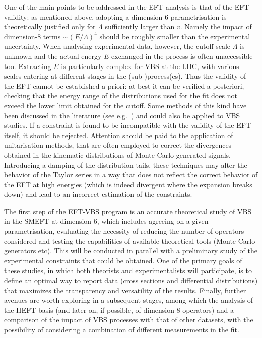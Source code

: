 One of the main points to be addressed in the EFT analysis is that of the EFT validity: as mentioned above, adopting a dimension-6 parametrisation is theoretically justified only for $\Lambda$ sufficiently larger than $v$. Namely the impact of dimension-8 terms $\sim (E/\Lambda)^4$ should be roughly smaller than the experimental uncertainty. When analysing experimental data, however, the cutoff scale $\Lambda$ is unknown and the actual energy $E$ exchanged in the process is often unaccessible too. Extracting $E$ is particularly complex for VBS at the LHC, with various scales entering at different stages in the (sub-)process(es).
Thus the validity of the EFT cannot be established a priori: at best it can be verified a posteriori, checking that the energy range of the distributions used for the fit does not exceed the lower limit obtained for the cutoff. Some methods of this kind have been discussed in the literature (see e.g.~\cite{Busoni:2013lha,Buchmueller:2013dya,Biekoetter:2014jwa,Englert:2014cva,Racco:2015dxa,Contino:2016jqw,Brivio:2017ije}) and could also be applied to VBS studies.
If a constraint is found to be incompatible with the validity of the EFT itself, it should be rejected.
Attention should be paid to the application of unitarisation methods, that are often employed to correct the divergences obtained in the kinematic distributions of Monte Carlo generated signals. Introducing a damping of the distribution tails, these techniques may alter the behavior of the Taylor series in a way that does not reflect the correct behavior of the EFT at high energies (which is indeed divergent where the expansion breaks down) and lead to an incorrect estimation of the constraints.

The first step of the EFT-VBS program is an accurate theoretical study of VBS in the SMEFT at dimension 6, which includes agreeing on a given parametrisation, evaluating the necessity of reducing the number of operators considered and testing the capabilities of available theoretical tools (Monte Carlo generators etc).
This will be conducted in parallel with a preliminary study of the experimental constraints that could be obtained. One of the primary goals of these studies, in which both theorists and experimentalists will participate, is to define an optimal way to report data (cross sections and differential distributions) that maximizes the transparency and versatility of the results.
Finally, further avenues are worth exploring in a subsequent stages, among which the analysis of the HEFT basis (and later on, if possible, of dimension-8 operators) and a comparison of the impact of VBS processes with that of other datasets, with the possibility of considering a combination of different measurements in the fit.


